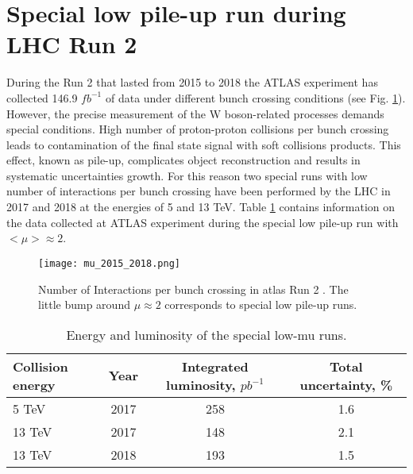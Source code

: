         \section{Special low pile-up run during LHC Run 2}
        During the Run 2 that lasted from 2015 to 2018 the ATLAS experiment has collected 146.9 $fb^{-1}$ of data under different bunch crossing conditions (see Fig. \ref{fig::run2lumi}). However, the precise measurement of the W boson-related processes demands special conditions. High number of proton-proton collisions per bunch crossing leads to contamination of the final state signal with soft collisions products. This effect, known as pile-up, complicates object reconstruction and results in systematic uncertainties growth. For this reason two special runs with low number of interactions per bunch crossing have been performed by the LHC in 2017 and 2018 at the energies of 5 and 13 TeV. Table \ref{tab:lowmu} contains information on the data collected at ATLAS experiment during the special low pile-up run with $<\mu> \approx 2$.\\
		 \begin{figure}[htpb]
			\texttt{[image: mu\_2015\_2018.png]}
			\caption{ Number of Interactions per bunch crossing in \gls{atlas} Run 2 \cite{run2lumi}. The little bump around $\mu \approx 2$ corresponds to special low pile-up runs.}
			\label{fig::run2lumi}
			\end{figure}
			\begin{table}
			\centering			
			\begin{tabular}{|l|c|c|c|}
			\hline
			\textbf{Collision energy} & \textbf{Year}& \textbf{Integrated luminosity, $pb^{-1}$ }&  Total uncertainty, \%\\
			\hline
			5 TeV  & 2017 & 258& 1.6\\
			13 TeV  & 2017 & 148& 2.1 \\
			13 TeV  & 2018 & 193& 1.5\\
			\hline
			\end{tabular}
			\caption{Energy and luminosity of the special low-mu runs.}
			\label{tab:lowmu}
			\end{table}